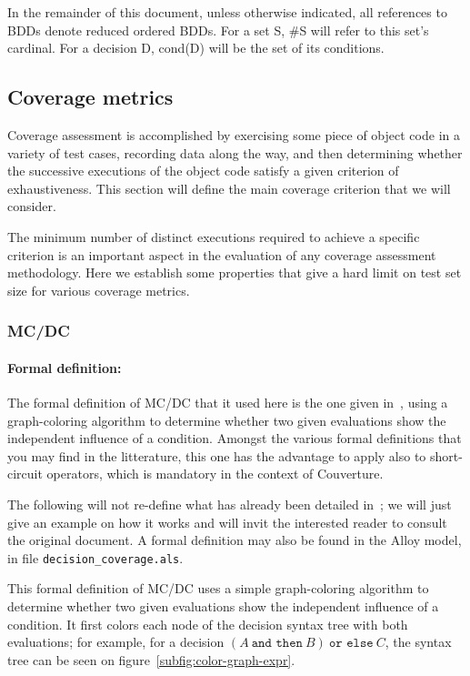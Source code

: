 \documentclass[a4paper,12pt,twoside]{article}
\newcommand{\couv}{{\sc Couverture}}
\newcommand{\andthen}{\texttt{and then}}
\newcommand{\orelse}{\texttt{or else}}
\begin{document}
In the remainder of this document, unless otherwise indicated, all
references to BDDs denote reduced ordered BDDs. For a set S, \#S will
refer to this set's cardinal. For a decision D, cond(D) will be the
set of its conditions.

\subsection{Coverage metrics}

Coverage assessment is accomplished by exercising some piece of object
code in a variety of test cases, recording data along the way, and
then determining whether the successive executions of the object code
satisfy a given criterion of exhaustiveness. This section will define
the main coverage criterion that we will consider.

The minimum number of distinct executions required to achieve a
specific criterion is an important aspect in the evaluation of any
coverage assessment methodology. Here we establish some properties
that give a hard limit on test set size for various coverage metrics.

\subsubsection{MC/DC}

\paragraph{Formal definition:}

The formal definition of MC/DC that it used here is the one given
in~\cite{ar0118}, using a graph-coloring algorithm to determine
whether two given evaluations show the independent influence of a
condition. Amongst the various formal definitions that you may find in
the litterature, this one has the advantage to apply also to
short-circuit operators, which is mandatory in the context of \couv{}.

The following will not re-define what has already been detailed
in~\cite{ar0118}; we will just give an example on how it works and
will invit the interested reader to consult the original document. A
formal definition may also be found in the Alloy model, in file
\verb|decision_coverage.als|.

This formal definition of MC/DC uses a simple graph-coloring algorithm
to determine whether two given evaluations show the independent
influence of a condition. It first colors each node of the decision
syntax tree with both evaluations; for example, for a decision
$(A \ \andthen{} \ B) \ \orelse{} \ C$, the syntax tree can be seen
on figure~\ref{subfig:color-graph-expr}.
\end{document}
